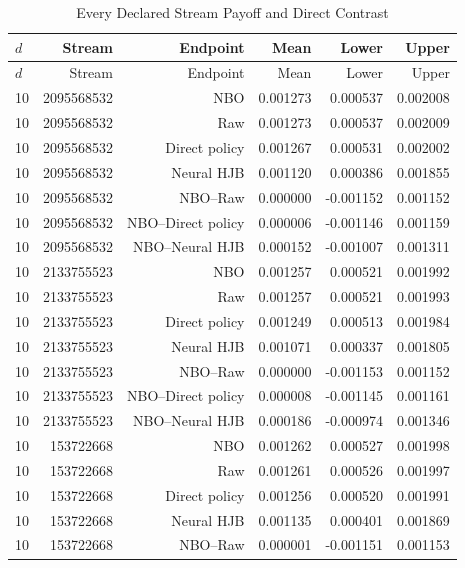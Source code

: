 \begingroup\small
\begin{longtable}{lrrrrr}
\caption{Every Declared Stream Payoff and Direct Contrast}\label{tab:r15methodstreams}\\
\toprule
$d$ & Stream & Endpoint & Mean & Lower & Upper \\
\midrule
\endfirsthead
\toprule
$d$ & Stream & Endpoint & Mean & Lower & Upper \\
\midrule
\endhead
10 & 2095568532 & NBO & 0.001273 & 0.000537 & 0.002008 \\
10 & 2095568532 & Raw & 0.001273 & 0.000537 & 0.002009 \\
10 & 2095568532 & Direct policy & 0.001267 & 0.000531 & 0.002002 \\
10 & 2095568532 & Neural HJB & 0.001120 & 0.000386 & 0.001855 \\
10 & 2095568532 & NBO--Raw & 0.000000 & -0.001152 & 0.001152 \\
10 & 2095568532 & NBO--Direct policy & 0.000006 & -0.001146 & 0.001159 \\
10 & 2095568532 & NBO--Neural HJB & 0.000152 & -0.001007 & 0.001311 \\
10 & 2133755523 & NBO & 0.001257 & 0.000521 & 0.001992 \\
10 & 2133755523 & Raw & 0.001257 & 0.000521 & 0.001993 \\
10 & 2133755523 & Direct policy & 0.001249 & 0.000513 & 0.001984 \\
10 & 2133755523 & Neural HJB & 0.001071 & 0.000337 & 0.001805 \\
10 & 2133755523 & NBO--Raw & 0.000000 & -0.001153 & 0.001152 \\
10 & 2133755523 & NBO--Direct policy & 0.000008 & -0.001145 & 0.001161 \\
10 & 2133755523 & NBO--Neural HJB & 0.000186 & -0.000974 & 0.001346 \\
10 & 153722668 & NBO & 0.001262 & 0.000527 & 0.001998 \\
10 & 153722668 & Raw & 0.001261 & 0.000526 & 0.001997 \\
10 & 153722668 & Direct policy & 0.001256 & 0.000520 & 0.001991 \\
10 & 153722668 & Neural HJB & 0.001135 & 0.000401 & 0.001869 \\
10 & 153722668 & NBO--Raw & 0.000001 & -0.001151 & 0.001153 \\

\end{longtable}
